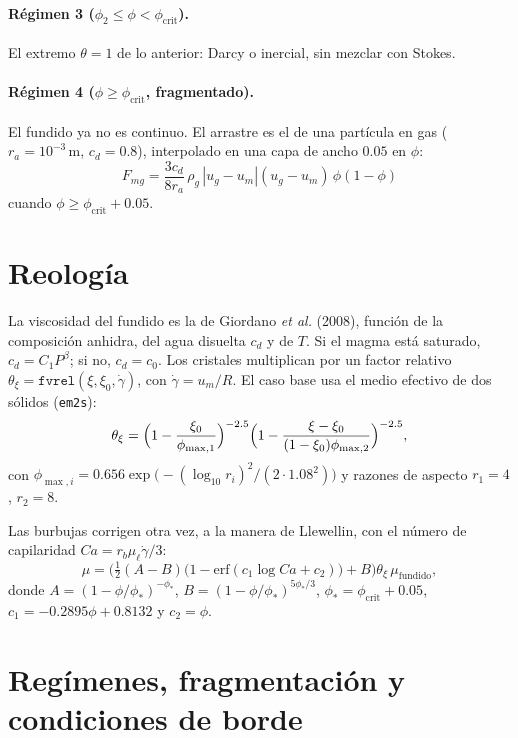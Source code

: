 \documentclass[11pt,a4paper]{article}
\begin{document}
\paragraph{Régimen 3 ($\phi_2\le\phi<\phi_{\mathrm{crit}}$).}
El extremo $\theta=1$ de lo anterior: Darcy o inercial, sin
mezclar con Stokes.

\paragraph{Régimen 4 ($\phi\ge\phi_{\mathrm{crit}}$, fragmentado).}
El fundido ya no es continuo. El arrastre es el de una partícula en
gas ($r_a=10^{-3}\,\mathrm{m}$, $c_d=0.8$), interpolado en una capa
de ancho $0.05$ en $\phi$:
\begin{equation}
F_{mg}
=\frac{3c_d}{8r_a}\,\rho_g\,|u_g-u_m|(u_g-u_m)\,\phi(1-\phi)
\end{equation}
cuando $\phi\ge\phi_{\mathrm{crit}}+0.05$.

\section{Reología}

La viscosidad del fundido es la de Giordano \emph{et al.} (2008),
función de la composición anhidra, del agua disuelta $c_d$ y de $T$.
Si el magma está saturado, $c_d=C_1 P^\beta$; si no, $c_d=c_0$. Los
cristales multiplican por un factor relativo
$\theta_\xi=\mathtt{fvrel}(\xi,\xi_0,\dot\gamma)$, con
$\dot\gamma=u_m/R$. El caso base usa el medio efectivo de dos sólidos
(\texttt{em2s}):
\begin{equation}
\theta_\xi
=\Bigl(1-\frac{\xi_0}{\phi_{\max,1}}\Bigr)^{-2.5}
\Bigl(1-\frac{\xi-\xi_0}{(1-\xi_0)\phi_{\max,2}}\Bigr)^{-2.5},
\end{equation}
con $\phi_{\max,i}=0.656\exp\bigl(-(\log_{10}r_i)^2/(2\cdot1.08^2)\bigr)$
y razones de aspecto $r_1=4$, $r_2=8$.

Las burbujas corrigen otra vez, a la manera de Llewellin, con el
número de capilaridad $Ca=r_b\mu_\ell\dot\gamma/3$:
\begin{equation}
\label{eq:mubub}
\mu
=\Biggl(\tfrac12(A-B)\bigl(1-\mathrm{erf}(c_1\log Ca+c_2)\bigr)+B\Biggr)
\theta_\xi\,\mu_{\mathrm{fundido}},
\end{equation}
donde $A=(1-\phi/\phi_\ast)^{-\phi_\ast}$,
$B=(1-\phi/\phi_\ast)^{5\phi_\ast/3}$, $\phi_\ast=\phi_{\mathrm{crit}}+0.05$,
$c_1=-0.2895\phi+0.8132$ y $c_2=\phi$.

\section{Regímenes, fragmentación y condiciones de borde}
\label{sec:reg}
\end{document}
